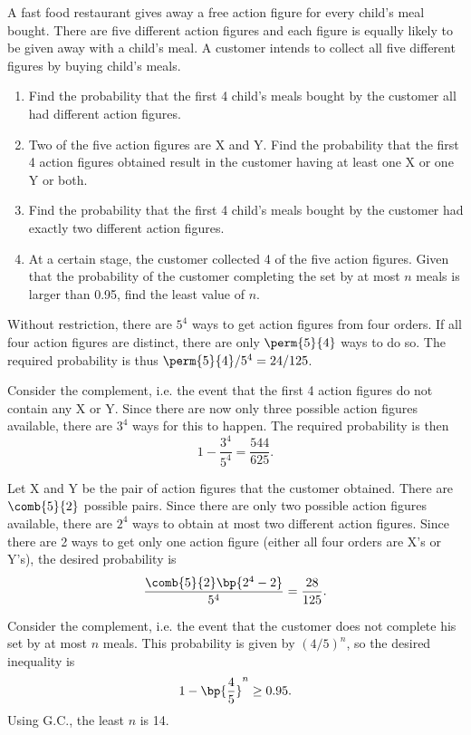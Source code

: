 \begin{problem}[\chili]
    A fast food restaurant gives away a free action figure for every child's meal bought. There are five different action figures and each figure is equally likely to be given away with a child's meal. A customer intends to collect all five different figures by buying child's meals.

    \begin{enumerate}
        \item Find the probability that the first 4 child's meals bought by the customer all had different action figures.
        \item Two of the five action figures are X and Y. Find the probability that the first 4 action figures obtained result in the customer having at least one X or one Y or both.
        \item Find the probability that the first 4 child's meals bought by the customer had exactly two different action figures.
        \item At a certain stage, the customer collected 4 of the five action figures. Given that the probability of the customer completing the set by at most $n$ meals is larger than 0.95, find the least value of $n$.
    \end{enumerate}
\end{problem}
\begin{solution}
    \begin{ppart}
        Without restriction, there are $5^4$ ways to get action figures from four orders. If all four action figures are distinct, there are only $\perm{5}{4}$ ways to do so. The required probability is thus $\perm{5}{4} / 5^4 = 24/125$.
    \end{ppart}
    \begin{ppart}
        Consider the complement, i.e. the event that the first 4 action figures do not contain any X or Y. Since there are now only three possible action figures available, there are $3^4$ ways for this to happen. The required probability is then \[1 - \frac{3^4}{5^4} = \frac{544}{625}.\]
    \end{ppart}
    \begin{ppart}
        Let X and Y be the pair of action figures that the customer obtained. There are $\comb{5}{2}$ possible pairs. Since there are only two possible action figures available, there are $2^4$ ways to obtain at most two different action figures. Since there are 2 ways to get only one action figure (either all four orders are X's or Y's), the desired probability is \[\frac{\comb{5}{2} \bp{2^4 - 2}}{5^4} = \frac{28}{125}.\]
    \end{ppart}
    \begin{ppart}
        Consider the complement, i.e. the event that the customer does not complete his set by at most $n$ meals. This probability is given by $(4/5)^n$, so the desired inequality is \[1 - \bp{\frac45}^n \geq 0.95.\] Using G.C., the least $n$ is 14.
    \end{ppart}
\end{solution}